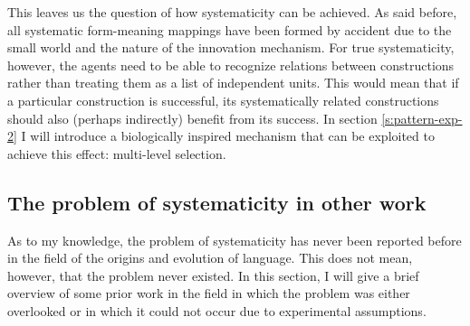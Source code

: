 This leaves us the question of how systematicity can be achieved. As said before, all systematic form-meaning mappings have been formed by accident due to the small world and the nature of the innovation mechanism. For true systematicity, however, the agents need to be able to recognize relations between constructions rather than treating them as a list of independent units. This would mean that if a particular construction is successful, its systematically related constructions should also (perhaps indirectly) benefit from its success. In section \ref{s:pattern-exp-2} I will introduce a biologically inspired mechanism that can be exploited to achieve this effect: multi-level selection.

\subsection{The problem of systematicity in other work}
\label{s:problem-systematicity}

As to my knowledge, the problem of systematicity has never been reported before in the field of the origins and evolution of language. This does not mean, however, that the problem never existed. In this section, I will give a brief overview of some prior work in the field in which the problem was either overlooked or in which it could not occur due to experimental assumptions.


